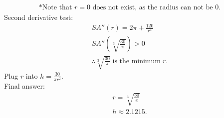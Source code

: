 \documentclass[12pt]{article}
\begin{document}
\begin{enumerate}
\begin{gather*}
                        \text{*Note that $r=0$ does not exist, as the radius can not be $0$.}
                    \end{gather*}
                    Second derivative test:
                    \begin{gather*}
                        SA''(r) = 2 \pi + \frac{120}{r^3} \\[6pt]
                        SA'' \left( \sqrt[3]{\frac{30}{\pi}} \right) > 0 \\[6pt]
                        \therefore \sqrt[3]{\frac{30}{\pi}} \; \text{is the minimum} \; r.
                    \end{gather*}
                    Plug $r$ into $h=\frac{30}{\pi r^2}$.
                    \\ Final answer:
                    \begin{gather*}
                        r = \sqrt[3]{\frac{30}{\pi}} \\[6pt]
                        h \approx 2.1215.
                    \end{gather*}
            \end{enumerate}
\end{document}

